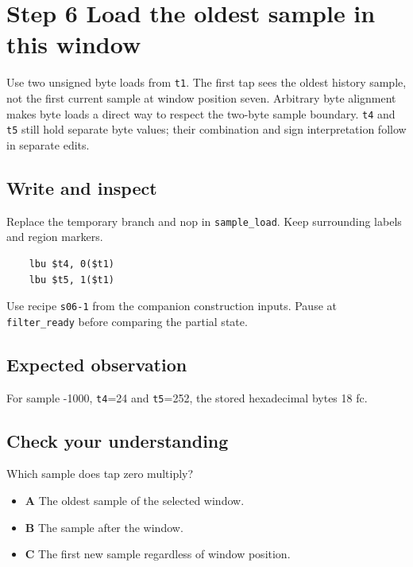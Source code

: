 \section{Step 6 Load the oldest sample in this window}\label{fir-s06}

Use two unsigned byte loads from \texttt{t1}. The first tap sees the oldest history sample, not the first current sample at window position seven. Arbitrary byte alignment makes byte loads a direct way to respect the two-byte sample boundary. \texttt{t4} and \texttt{t5} still hold separate byte values; their combination and sign interpretation follow in separate edits.

\subsection{Write and inspect}
Replace the temporary branch and nop in \texttt{sample\_load}. Keep surrounding labels and region markers.

\begin{verbatim}
    lbu $t4, 0($t1)
    lbu $t5, 1($t1)
\end{verbatim}
Use recipe \texttt{s06-1} from the companion construction inputs. Pause at \texttt{filter\_ready} before comparing the partial state.

\subsection{Expected observation}
For sample -1000, \texttt{t4}=24 and \texttt{t5}=252, the stored hexadecimal bytes 18 fc.

\subsection{Check your understanding}
Which sample does tap zero multiply?

\begin{itemize}
\item \textbf{A} The oldest sample of the selected window.
\item \textbf{B} The sample after the window.
\item \textbf{C} The first new sample regardless of window position.
\end{itemize}
